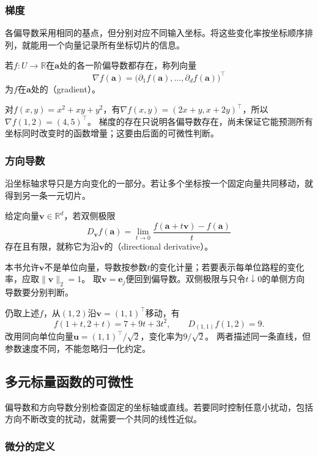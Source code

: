 \subsubsection{梯度}

各偏导数采用相同的基点，但分别对应不同输入坐标。将这些变化率按坐标顺序排列，就能用一个向量记录所有坐标切片的信息。
\begin{definition}[梯度]
\label{def:multivariable-gradient}
若$f:U\to\mathbb R$在$\bm a$处的各一阶偏导数都存在，称列向量
\[
 \nabla f(\bm a)=\bigl(\partial_1f(\bm a),\ldots,\partial_df(\bm a)\bigr)^\top
\]
为$f$在$\bm a$处的（gradient）。
\end{definition}
对$f(x,y)=x^2+xy+y^2$，有$\nabla f(x,y)=(2x+y,x+2y)^\top$，所以$\nabla f(1,2)=(4,5)^\top$。
梯度的存在只说明各偏导数存在，尚未保证它能预测所有坐标同时改变时的函数增量；这要由后面的可微性判断。

\subsubsection{方向导数}

沿坐标轴求导只是方向变化的一部分。若让多个坐标按一个固定向量共同移动，就得到另一条一元切片。
\begin{definition}[方向导数]
\label{def:multivariable-directional-derivative}
给定向量$\bm v\in\mathbb R^d$，若双侧极限
\[
 D_{\bm v}f(\bm a)
 =\lim_{t\to0}\frac{f(\bm a+t\bm v)-f(\bm a)}t
\]
存在且有限，就称它为沿$\bm v$的（directional derivative）。
\end{definition}
本书允许$\bm v$不是单位向量，导数按参数$t$的变化计量；若要表示每单位路程的变化率，应取$\lVert\bm v\rVert_2=1$。
取$\bm v=\bm e_j$便回到偏导数。双侧极限与只令$t\downarrow0$的单侧方向导数要分别判断。

仍取上述$f$，从$(1,2)$沿$\bm v=(1,1)^\top$移动，有
\[
 f(1+t,2+t)=7+9t+3t^2,
 \qquad D_{(1,1)}f(1,2)=9.
\]
改用同向单位向量$\bm u=(1,1)^\top/\sqrt2$，变化率为$9/\sqrt2$。
两者描述同一条直线，但参数速度不同，不能忽略归一化约定。

\subsection{多元标量函数的可微性}
\label{sec:multivariable-total-differentiation}

偏导数和方向导数分别检查固定的坐标轴或直线。若要同时控制任意小扰动，包括方向不断改变的扰动，就需要一个共同的线性近似。

\subsubsection{微分的定义}

